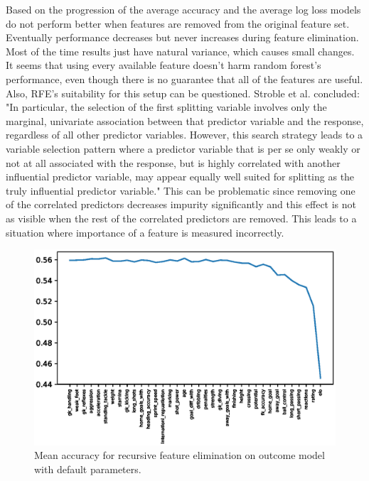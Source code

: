 Based on the progression of the average accuracy and the average log loss models do not perform better when features are removed from the original feature set. Eventually performance decreases but never increases during feature elimination. Most of the time results just have natural variance, which causes small changes. It seems that using every available feature doesn't harm random forest's performance, even though there is no guarantee that all of the features are useful. Also, RFE's suitability for this setup can be questioned. Stroble et al. concluded: "In particular, the selection of the first splitting variable involves only the marginal, univariate association between that predictor variable and the response, regardless of all other predictor variables. However, this search strategy leads to a variable selection pattern where a predictor variable that is per se only weakly or not at all associated with the response, but is highly correlated with another influential predictor variable, may appear equally well suited for splitting as the truly influential predictor variable." This can be problematic since removing one of the correlated predictors decreases impurity significantly and this effect is not as visible when the rest of the correlated predictors are removed. This leads to a situation where importance of a feature is measured incorrectly.
\begin{figure}[H]
    \centering
    \includegraphics[width=1\textwidth]{img/default_avg_accuracy.eps}
    \caption{Mean accuracy for recursive feature elimination on outcome model with default parameters.}
    \label{fig:def_avg_accu}
\end{figure}

